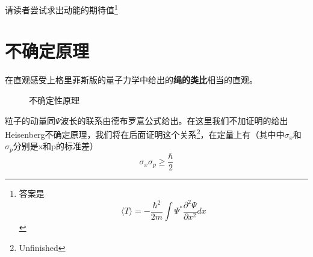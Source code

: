 		请读者尝试求出动能的期待值\footnote{答案是
		\begin{equation}
		\langle T\rangle=-\frac{\hbar^{2}}{2 m} \int \Psi^{*} \frac{\partial^{2} \Psi}{\partial x^{2}} d x
		\end{equation}}

	\section{不确定原理}
		在直观感受上格里菲斯版的量子力学中给出的\textbf{绳的类比}相当的直观。\begin{figure}[H]
				\centering
				\quad
				\caption{不确定性原理}
				\end{figure}

		粒子的动量同$\Psi$波长的联系由德布罗意公式给出。在这里我们不加证明的给出Heisenberg不确定原理，我们将在后面证明这个关系\footnote{Unfinished}，在定量上有（其中中$\sigma_x$和$\sigma_p$分别是x和p的标准差）
			\begin{equation}
			\sigma_{x} \sigma_{p} \geq \frac{\hbar}{2}
			\end{equation}